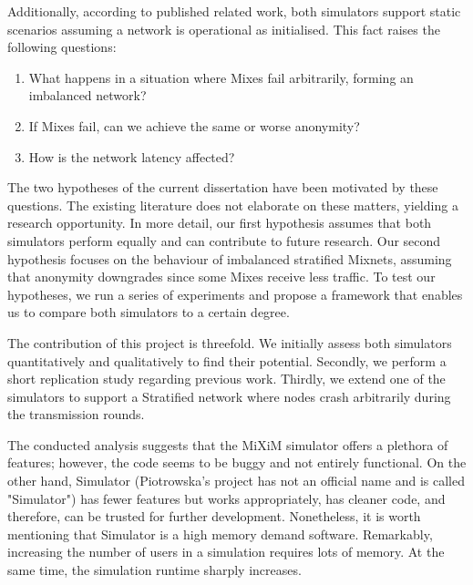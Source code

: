 \documentclass[logo,msc,cyber]{infthesis}   %
\begin{document}
Additionally, according to published related work\cite{ben2021mixim,
piotrowska2021studying, guirat2022mixnet}, both simulators support static
scenarios assuming a network is operational as initialised. This fact raises the
following questions:

\begin{enumerate}
   \item What happens in a situation where Mixes fail arbitrarily, forming an imbalanced network?
   \item If Mixes fail, can we achieve the same or worse anonymity?
   \item How is the network latency affected?
\end{enumerate}

The two hypotheses of the current dissertation have been motivated by these
questions. The existing literature does not elaborate on these matters, yielding
a research opportunity. In more detail, our first hypothesis assumes that both
simulators perform equally and can contribute to future research. Our second
hypothesis focuses on the behaviour of imbalanced stratified Mixnets, assuming
that anonymity downgrades since some Mixes receive less traffic. To test our
hypotheses, we run a series of experiments and propose a framework that enables
us to compare both simulators to a certain degree.

The contribution of this project is threefold. We initially assess both
simulators quantitatively and qualitatively to find their potential. Secondly,
we perform a short replication study regarding previous work. Thirdly, we extend
one of the simulators to support a Stratified network where nodes crash
arbitrarily during the transmission rounds.

The conducted analysis suggests that the MiXiM\cite{mixim} simulator offers a
plethora of features; however, the code seems to be buggy and not entirely
functional. On the other hand, Simulator\cite{simulator} (Piotrowska's project
has not an official name and is called "Simulator") has fewer features but works
appropriately, has cleaner code, and therefore, can be trusted for further
development. Nonetheless, it is worth mentioning that Simulator is a high memory
demand software. Remarkably, increasing the number of users in a simulation
requires lots of memory. At the same time, the simulation runtime sharply
increases.
\end{document}
